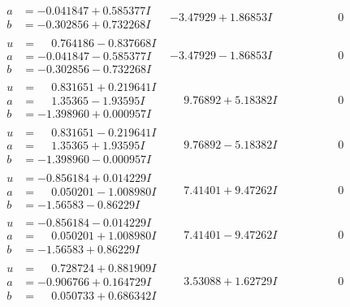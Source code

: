\documentclass[1p]{elsarticle_modified}
\theoremstyle{definition}
\begin{document}
$$\begin{array}{c|c|c}
\begin{aligned}
a &= -0.041847 + 0.585377 I \\
b &= -0.302856 + 0.732268 I\end{aligned}
 & -3.47929 + 1.86853 I & \phantom{-0.000000 } 0 \\ \hline\begin{aligned}
u &= \phantom{-}0.764186 - 0.837668 I \\
a &= -0.041847 - 0.585377 I \\
b &= -0.302856 - 0.732268 I\end{aligned}
 & -3.47929 - 1.86853 I & \phantom{-0.000000 } 0 \\ \hline\begin{aligned}
u &= \phantom{-}0.831651 + 0.219641 I \\
a &= \phantom{-}1.35365 - 1.93595 I \\
b &= -1.398960 + 0.000957 I\end{aligned}
 & \phantom{-}9.76892 + 5.18382 I & \phantom{-0.000000 } 0 \\ \hline\begin{aligned}
u &= \phantom{-}0.831651 - 0.219641 I \\
a &= \phantom{-}1.35365 + 1.93595 I \\
b &= -1.398960 - 0.000957 I\end{aligned}
 & \phantom{-}9.76892 - 5.18382 I & \phantom{-0.000000 } 0 \\ \hline\begin{aligned}
u &= -0.856184 + 0.014229 I \\
a &= \phantom{-}0.050201 - 1.008980 I \\
b &= -1.56583 - 0.86229 I\end{aligned}
 & \phantom{-}7.41401 + 9.47262 I & \phantom{-0.000000 } 0 \\ \hline\begin{aligned}
u &= -0.856184 - 0.014229 I \\
a &= \phantom{-}0.050201 + 1.008980 I \\
b &= -1.56583 + 0.86229 I\end{aligned}
 & \phantom{-}7.41401 - 9.47262 I & \phantom{-0.000000 } 0 \\ \hline\begin{aligned}
u &= \phantom{-}0.728724 + 0.881909 I \\
a &= -0.906766 + 0.164729 I \\
b &= \phantom{-}0.050733 + 0.686342 I\end{aligned}
 & \phantom{-}3.53088 + 1.62729 I & \phantom{-0.000000 } 0 \\ \hline\begin{aligned}

\end{aligned}
\end{array}$$
\end{document}
